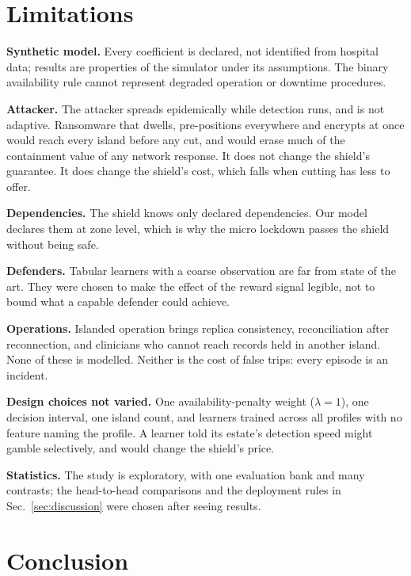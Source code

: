 \documentclass[conference,compsoc]{IEEEtran}
\begin{document}


\section{Limitations}
\label{sec:limitations}

\textbf{Synthetic model.} Every coefficient is declared, not identified from
hospital data; results are properties of the simulator under its
assumptions. The binary availability rule cannot represent degraded
operation or downtime procedures.

\textbf{Attacker.} The attacker spreads epidemically while detection runs,
and is not adaptive. Ransomware that dwells, pre-positions everywhere and
encrypts at once would reach every island before any cut, and would erase
much of the containment value of any network response. It does not change
the shield's guarantee. It does change the shield's cost, which falls when
cutting has less to offer.

\textbf{Dependencies.} The shield knows only declared dependencies. Our
model declares them at zone level, which is why the micro lockdown passes
the shield without being safe.

\textbf{Defenders.} Tabular learners with a coarse observation are far from
state of the art. They were chosen to make the effect of the reward signal
legible, not to bound what a capable defender could achieve.

\textbf{Operations.} Islanded operation brings replica consistency,
reconciliation after reconnection, and clinicians who cannot reach records
held in another island. None of these is modelled. Neither is the cost of
false trips: every episode is an incident.

\textbf{Design choices not varied.} One availability-penalty weight
($\lambda=1$), one decision interval, one island count, and learners trained
across all profiles with no feature naming the profile. A learner told its
estate's detection speed might gamble selectively, and would change the
shield's price.

\textbf{Statistics.} The study is exploratory, with one evaluation bank and
many contrasts; the head-to-head comparisons and the deployment rules in
Sec.~\ref{sec:discussion} were chosen after seeing results.

\section{Conclusion}
\end{document}
